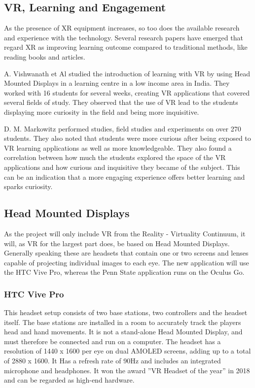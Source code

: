         \subsection{VR, Learning and Engagement}
            As the presence of XR equipment increases, so too does the available research and experience with the technology. Several research papers have emerged that regard XR as improving learning outcome compared to traditional methods, like reading books and articles.
            
            A. Vishwanath et Al \cite{vr_low_income} studied the introduction of learning with VR by using Head Mounted Displays in a learning centre in a low income area in India. They worked with 16 students for several weeks, creating VR applications that covered several fields of study. They observed that the use of VR lead to the students displaying more curiosity in the field and being more inquisitive.
            
            D. M. Markowitz \cite{virtual_field_trips_learning} performed studies, field studies and experiments on over 270 students. They also noted that students were more curious after being exposed to VR learning applications as well as more knowledgeable. They also found a correlation between how much the students explored the space of the VR applications and how curious and inquisitive they became of the subject. This can be an indication that a more engaging experience offers better learning and sparks curiosity.
        
        \subsection{Head Mounted Displays}
            As the project will only include VR from the Reality - Virtuality Continuum, it will, as VR for the largest part does, be based on Head Mounted Displays. Generally speaking these are headsets that contain one or two screens and lenses capable of projecting individual images to each eye. The new application will use the HTC Vive Pro, whereas the Penn State application runs on the Oculus Go.
                
                \subsubsection{HTC Vive Pro}
                    This headset setup consists of two base stations, two controllers and the headset itself. The base stations are installed in a room to accurately track the players head and hand movements. It is not a stand-alone Head Mounted Display, and must therefore be connected and run on a computer. The headset has a resolution of 1440 x 1600 per eye on dual AMOLED screens, adding up to a total of 2880 x 1600. It Has a refresh rate of 90Hz and includes an integrated microphone and headphones. It won the award ''VR Headset of the year'' in 2018 and can be regarded as high-end hardware. \cite{vive_pro}
                    
